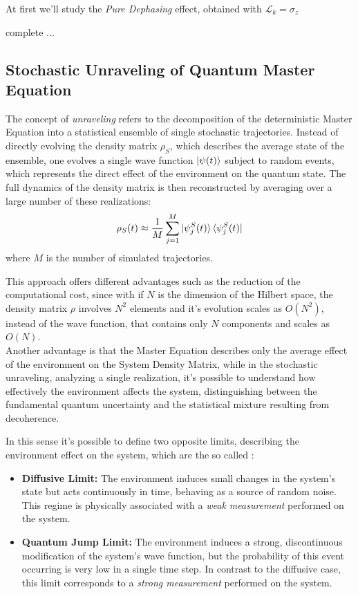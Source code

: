 \documentclass[a4paper,12pt]{article}
\begin{document}
	At first we'll study the \textit{Pure Dephasing} effect, obtained with $ \mathcal{L}_{k} = \sigma_{z} $

	complete ...

	\newpage

	\subsection{Stochastic Unraveling of Quantum Master Equation}
	\label{sub:unraveling}

	The concept of \textit{unraveling} refers to the decomposition of the deterministic Master Equation into a statistical ensemble of single stochastic trajectories. Instead of directly evolving the density matrix $ \rho_{S} $, which describes the average state of the ensemble, one evolves a single wave function $ \ket{\psi(t)} $ subject to random events, which represents the direct effect of the environment on the quantum state. The full dynamics of the density matrix is then reconstructed by averaging over a large number of these realizations:
	\begin{equation}
		\rho_{S}(t) \approx \frac{1}{M} \sum_{j=1}^M \ket{\psi_{j}^{S}(t)}\bra{\psi_{j}^{S}(t)}
		\label{eq:mean_over_traj}
	\end{equation}
	where $M$ is the number of simulated trajectories.

	This approach offers different advantages such as the reduction of the computational cost, since with if $N$ is the dimension of the Hilbert space, the density matrix $\rho$ involves $N^2$ elements and it's evolution scales as $O(N^2)$, instead of the wave function, that contains only $N$ components and scales as $O(N)$. \\
	Another advantage is that the Master Equation describes only the average effect of the environment on the System Density Matrix, while in the stochastic unraveling, analyzing a single realization, it's possible to understand how effectively the environment affects the system, distinguishing between the fundamental quantum uncertainty and the statistical mixture resulting from decoherence.

	In this sense it's possible to define two opposite limits, describing the  environment effect on the system, which are the so called :

	\begin{itemize}
		\item \textbf{Diffusive Limit:} The environment induces small changes in the system's state but acts continuously in time, behaving as a source of random noise. This regime is physically associated with a \textit{weak measurement} performed on the system.

		\item \textbf{Quantum Jump Limit:} The environment induces a strong, discontinuous modification of the system's wave function, but the probability of this event occurring is very low in a single time step. In contrast to the diffusive case, this limit corresponds to a \textit{strong measurement} performed on the system.
	\end{itemize}
\end{document}
